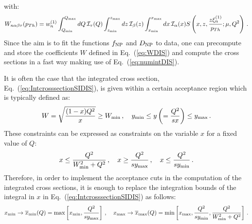 \documentclass[10pt,a4paper]{article}
\begin{document}
with:
\begin{equation}
  W_{n\alpha\beta\tau}(p_{Th}) = 
  w_n^{(1)} \int_{Q_{\rm min}}^{Q_{\rm
      max}}dQ\,\mathcal{I}_\tau(Q) \int_{z_{\rm min}}^{z_{\rm max}}dz\,
  \mathcal{I}_\beta(z) \int_{x_{\rm min}}^{x_{\rm
      max}}dx\, \mathcal{I}_\alpha(x)
  S\left(x,z,\frac{z\xi_n^{(1)}}{p_{Th}};\mu,Q^2\right)\,.
\label{eq:WDIS}
\end{equation}
Since the aim is to fit the functions $f_{\rm NP}$ and $D_{\rm NP}$ to
data, one can precompute and store the coefficients $W$ defined in
Eq.~(\ref{eq:WDIS}) and compute the cross sections in a fast way
making use of Eq.~(\ref{eq:numintDIS}).

It is often the case that the integrated cross section,
Eq.~(\ref{eq:IntcrosssectionSIDIS}), is given within a certain
acceptance region which is typically defined as:
\begin{equation}
W=\sqrt{\frac{(1-x)Q^2}{x}}\geq W_{\rm min}\,,\quad y_{\rm min}\leq y
\left(=\frac{Q^2}{sx}\right) \leq y_{\rm max}\,.
\end{equation}
These constraints can be expressed as constraints on the variable $x$
for a fixed value of $Q$:
\begin{equation}
  x\leq \frac{Q^2}{W_{\rm min}^2+Q^2}\,,\quad x\geq\frac{Q^2}{s y_{\rm
      max}}\,,\quad x\leq 
  \frac{Q^2}{sy_{\rm min}}\,.
\end{equation}
Therefore, in order to implement the acceptance cuts in the
computation of the integrated cross sections, it is enough to replace
the integration bounds of the integral in $x$ in
Eq.~(\ref{eq:IntcrosssectionSIDIS}) as follows:
\begin{equation}
  x_{\rm min}\rightarrow \overline{x}_{\rm min}(Q)=\mbox{max}\left[x_{\rm min},\frac{Q^2}{s y_{\rm
        max}}\right]\,,\quad   x_{\rm max}\rightarrow \overline{x}_{\rm max}(Q)=\mbox{min}\left[x_{\rm max},\frac{Q^2}{s y_{\rm
        min}}, \frac{Q^2}{W_{\rm min}^2+Q^2}\right]\,.
\end{equation}
\end{document}
